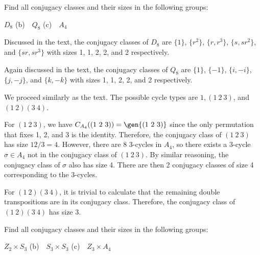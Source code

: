 \begin{exercise}
	\label{ex4.3.2} Find all conjugacy classes and their sizes in the following groups:
	\begin{subproblems}
		\item $D_8$ \quad (b)~~$Q_8$ \quad (c)~~$A_4$
	\end{subproblems}
\end{exercise}

\begin{solalph}
	\item Discussed in the text, the conjugacy classes of $D_8$ are $\{1\}$, $\{r^2\}$, $\{r, r^3\}$, $\{s, sr^2\}$, and $\{sr, sr^3\}$ with sizes 1, 1, 2, 2, and 2 respectively.
	\item Again discussed in the text, the conjugacy classes of $Q_8$ are $\{1\}$, $\{-1\}$, $\{i, -i\}$, $\{j, -j\}$, and $\{k, -k\}$ with sizes 1, 1, 2, 2, and 2 respectively.
	\item We proceed similarly as the text. The possible cycle types are $1, (1\ 2\ 3)$, and $(1\ 2)(3\ 4)$.
	
	For $(1\ 2\ 3)$, we have $C_{A_4}((1\ 2\ 3)) = \gen{(1\ 2\ 3)}$ since the only permutation that fixes 1, 2, and 3 is the identity. Therefore, the conjugacy class of $(1\ 2\ 3)$ has size $12/3 = 4$. However, there are 8 3-cycles in $A_4$, so there exists a 3-cycle $\sigma \in A_4$ not in the conjugacy class of $(1\ 2\ 3)$. By similar reasoning, the conjugacy class of $\sigma$ also has size 4. There are then 2 conjugacy classes of size 4 corresponding to the 3-cycles.

	For $(1\ 2)(3\ 4)$, it is trivial to calculate that the remaining double transpositions are in its conjugacy class. Therefore, the conjugacy class of $(1\ 2)(3\ 4)$ has size 3.
\end{solalph}

\newpage

\begin{exercise}
	Find all conjugacy classes and their sizes in the following groups:
	\begin{subproblems}
		\item $Z_2 \times S_3$ \quad (b)~~$S_3 \times S_3$ \quad (c)~~$Z_3 \times A_4$
	\end{subproblems}
\end{exercise}

